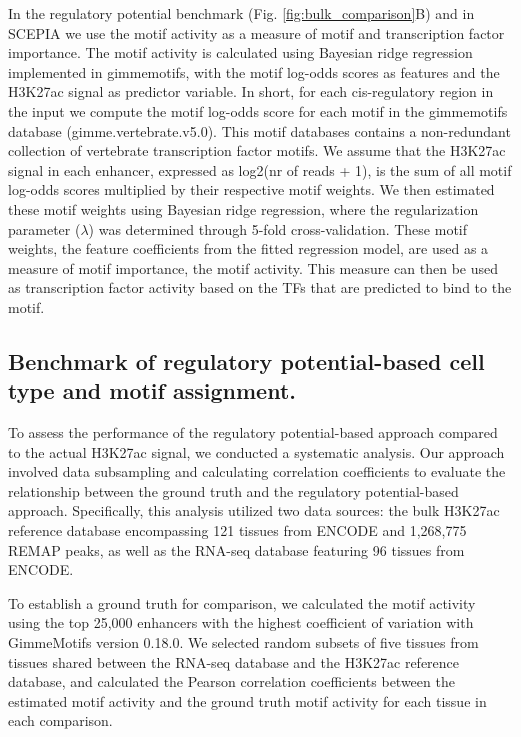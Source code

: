 In the regulatory potential benchmark (Fig. \ref{fig:bulk_comparison}B) and in SCEPIA we use the motif activity as a measure of motif and transcription factor importance. The motif activity\cite{FANTOM2009, Balwierz2014} is calculated using Bayesian ridge regression implemented in gimmemotifs\cite{Bruse_2018}, with the motif log-odds scores as features and the H3K27ac signal as predictor variable. In short, for each cis-regulatory region in the input we compute the motif log-odds score for each motif in the gimmemotifs database (gimme.vertebrate.v5.0). This motif databases contains a non-redundant collection of vertebrate transcription factor motifs\cite{Bruse_2018}. We assume that the H3K27ac signal in each enhancer, expressed as log2(nr of reads + 1), is the sum of all motif log-odds scores multiplied by their respective motif weights. We then estimated these motif weights using Bayesian ridge regression, where the regularization parameter ($\lambda$) was determined through 5-fold cross-validation. These motif weights, the feature coefficients from the fitted regression model, are used as a measure of motif importance, the motif activity. This measure can then be used as transcription factor activity based on the TFs that are predicted to bind to the motif.

\subsection{Benchmark of regulatory potential-based cell type and motif assignment.}

To assess the performance of the regulatory potential-based approach compared to the actual H3K27ac signal, we conducted a systematic analysis. Our approach involved data subsampling and calculating correlation coefficients to evaluate the relationship between the ground truth and the regulatory potential-based approach. Specifically, this analysis utilized two data sources: the bulk H3K27ac reference database encompassing 121 tissues from ENCODE and 1,268,775 REMAP peaks, as well as the RNA-seq database featuring 96 tissues from ENCODE.

To establish a ground truth for comparison, we calculated the motif activity using the top 25,000 enhancers with the highest coefficient of variation with GimmeMotifs version 0.18.0\cite{Bruse_2018}. We selected random subsets of five tissues from tissues shared between the RNA-seq database and the H3K27ac reference database, and calculated the Pearson correlation coefficients between the estimated motif activity and the ground truth motif activity for each tissue in each comparison.

